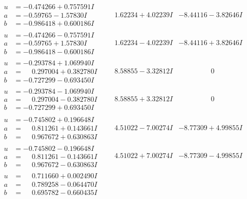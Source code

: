 \documentclass[1p]{elsarticle_modified}
\theoremstyle{definition}
\begin{document}
$$\begin{array}{c|c|c}
\begin{aligned}
u &= -0.474266 + 0.757591 I \\
a &= -0.59765 - 1.57830 I \\
b &= -0.986418 + 0.600186 I\end{aligned}
 & \phantom{-}1.62234 + 4.02239 I & -8.44116 - 3.82646 I \\ \hline\begin{aligned}
u &= -0.474266 - 0.757591 I \\
a &= -0.59765 + 1.57830 I \\
b &= -0.986418 - 0.600186 I\end{aligned}
 & \phantom{-}1.62234 - 4.02239 I & -8.44116 + 3.82646 I \\ \hline\begin{aligned}
u &= -0.293784 + 1.069940 I \\
a &= \phantom{-}0.297004 + 0.382780 I \\
b &= -0.727299 - 0.693450 I\end{aligned}
 & \phantom{-}8.58855 - 3.32812 I & \phantom{-0.000000 } 0 \\ \hline\begin{aligned}
u &= -0.293784 - 1.069940 I \\
a &= \phantom{-}0.297004 - 0.382780 I \\
b &= -0.727299 + 0.693450 I\end{aligned}
 & \phantom{-}8.58855 + 3.32812 I & \phantom{-0.000000 } 0 \\ \hline\begin{aligned}
u &= -0.745802 + 0.196648 I \\
a &= \phantom{-}0.811261 + 0.143661 I \\
b &= \phantom{-}0.967672 + 0.630863 I\end{aligned}
 & \phantom{-}4.51022 - 7.00274 I & -8.77309 + 4.99855 I \\ \hline\begin{aligned}
u &= -0.745802 - 0.196648 I \\
a &= \phantom{-}0.811261 - 0.143661 I \\
b &= \phantom{-}0.967672 - 0.630863 I\end{aligned}
 & \phantom{-}4.51022 + 7.00274 I & -8.77309 - 4.99855 I \\ \hline\begin{aligned}
u &= \phantom{-}0.711660 + 0.002490 I \\
a &= \phantom{-}0.789258 - 0.064470 I \\
b &= \phantom{-}0.695782 - 0.660435 I\end{aligned}

\end{array}$$
\end{document}
